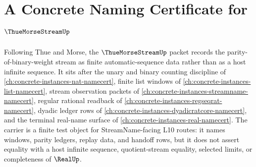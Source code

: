\chapter{A Concrete Naming Certificate for $\ThueMorseStreamUp$}
\label{ch:concrete-instances-thue-morse-stream-namecert}

Following Thue and Morse, the $\ThueMorseStreamUp$ packet records the parity-of-binary-weight stream as finite automatic-sequence data rather than as a host infinite sequence. It sits after the unary and binary counting discipline of \autoref{ch:concrete-instances-nat-namecert}, finite list windows of \autoref{ch:concrete-instances-list-namecert}, stream observation packets of \autoref{ch:concrete-instances-streamname-namecert}, regular rational readback of \autoref{ch:concrete-instances-regseqrat-namecert}, dyadic ledger rows of \autoref{ch:concrete-instances-dyadicratcore-namecert}, and the terminal real-name surface of \autoref{ch:concrete-instances-real-namecert}. The carrier is a finite test object for StreamName-facing L10 routes: it names windows, parity ledgers, replay data, and handoff rows, but it does not assert equality with a host infinite sequence, quotient-stream equality, selected limits, or completeness of $\RealUp$.

